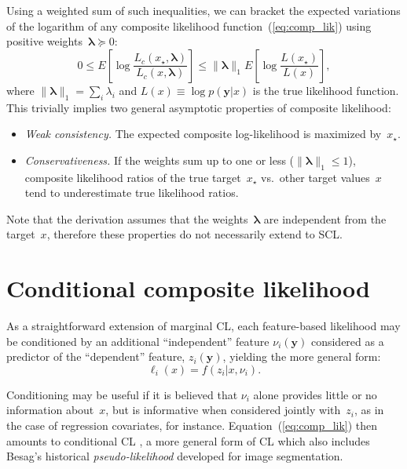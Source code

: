 \documentclass[english]{scrartcl}
\def\y{{\mathbf{y}}}
\newcommand{\blambda}{{\boldsymbol{\lambda}}}
\begin{document}
Using a weighted sum of such inequalities, we can bracket the expected variations of the logarithm of any composite likelihood function~(\ref{eq:comp_lik}) using positive weights~$\blambda\succeq 0$:
\begin{equation}
\label{eq:variation_bound}
0 \leq
E\left[ \log \frac{L_c(x_\star, \blambda)}{L_c(x,\blambda)} \right]
\leq 
\|\blambda\|_1 E\left[ \log \frac{L(x_\star)}{L(x)} \right]
,
\end{equation}
where $\|\blambda\|_1 =\sum_i \lambda_i$ and $L(x)\equiv \log p(\y|x)$ is the true likelihood function. This trivially implies two general asymptotic properties of composite likelihood:
\begin{itemize}
\item {\em Weak consistency.} The expected composite log-likelihood is maximized by~$x_\star$.
\item {\em Conservativeness.} If the weights sum up to one or less ($\|\blambda\|_1\leq 1$), composite likelihood ratios of the true target~$x_\star$ vs.~other target values~$x$ tend to  underestimate true likelihood ratios.
\end{itemize}

Note that the derivation assumes that the weights~$\blambda$ are independent from the target~$x$, therefore these properties do not necessarily extend to SCL.


\section{Conditional composite likelihood}
\label{app:conditional}

As a straightforward  extension of marginal CL, each feature-based likelihood may be conditioned by an additional ``independent'' feature $\nu_i(\y)$ considered as a predictor of the ``dependent'' feature, $z_i(\y)$, yielding the more general form:
\begin{equation}
\label{eq:cond_feat_lik}
\ell_i(x) = f(z_i|x,\nu_i).
\end{equation}

Conditioning may be useful if it is believed that $\nu_i$ alone provides little or no information about~$x$, but is informative when considered jointly with~$z_i$, as in the case of regression covariates, for instance. Equation~(\ref{eq:comp_lik}) then amounts to conditional CL \cite{Varin-11}, a more general form of CL which also includes Besag's historical {\em pseudo-likelihood} \cite{Besag-74} developed for image segmentation.
\end{document}
